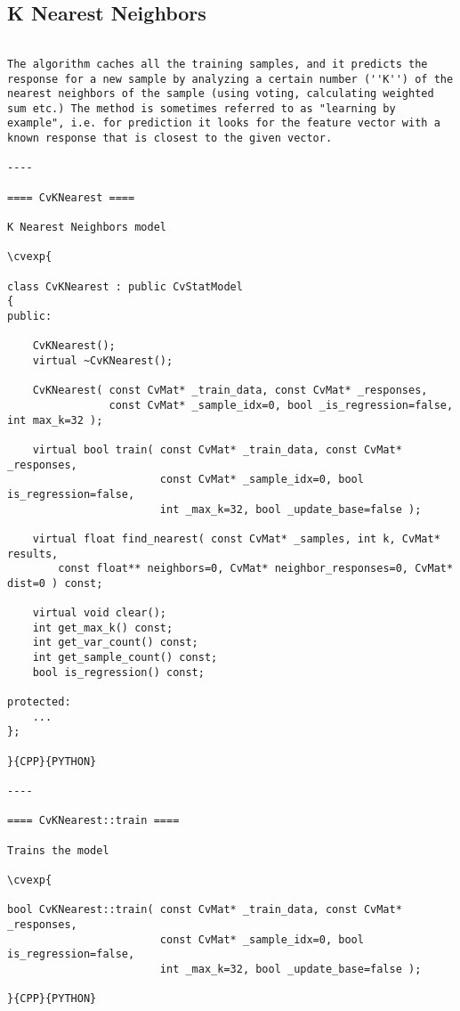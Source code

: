\subsection{K Nearest Neighbors}
\begin{verbatim}

The algorithm caches all the training samples, and it predicts the response for a new sample by analyzing a certain number (''K'') of the nearest neighbors of the sample (using voting, calculating weighted sum etc.) The method is sometimes referred to as "learning by example", i.e. for prediction it looks for the feature vector with a known response that is closest to the given vector.

----

==== CvKNearest ====

K Nearest Neighbors model

\cvexp{

class CvKNearest : public CvStatModel
{
public:

    CvKNearest();
    virtual ~CvKNearest();

    CvKNearest( const CvMat* _train_data, const CvMat* _responses,
                const CvMat* _sample_idx=0, bool _is_regression=false, int max_k=32 );

    virtual bool train( const CvMat* _train_data, const CvMat* _responses,
                        const CvMat* _sample_idx=0, bool is_regression=false,
                        int _max_k=32, bool _update_base=false );

    virtual float find_nearest( const CvMat* _samples, int k, CvMat* results,
        const float** neighbors=0, CvMat* neighbor_responses=0, CvMat* dist=0 ) const;

    virtual void clear();
    int get_max_k() const;
    int get_var_count() const;
    int get_sample_count() const;
    bool is_regression() const;

protected:
    ...
};

}{CPP}{PYTHON}

----

==== CvKNearest::train ====

Trains the model

\cvexp{

bool CvKNearest::train( const CvMat* _train_data, const CvMat* _responses,
                        const CvMat* _sample_idx=0, bool is_regression=false,
                        int _max_k=32, bool _update_base=false );

}{CPP}{PYTHON}


\end{verbatim}
